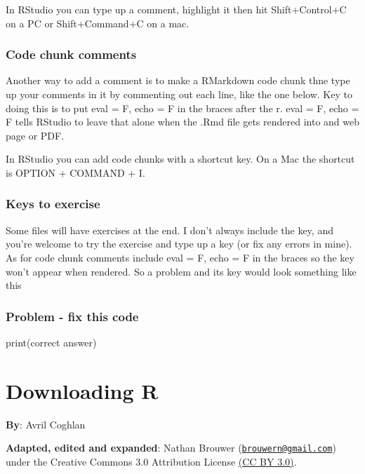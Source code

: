 \documentclass[
]{book}
\newenvironment{Shaded}{\begin{snugshade}}{\end{snugshade}}
\newcommand{\FunctionTok}[1]{\textcolor[rgb]{0.00,0.00,0.00}{#1}}
\newcommand{\NormalTok}[1]{#1}
\begin{document}
In RStudio you can type up a comment, highlight it then hit Shift+Control+C on a PC or Shift+Command+C on a mac.

\hypertarget{code-chunk-comments}{%
\subsection{Code chunk comments}\label{code-chunk-comments}}

Another way to add a comment is to make a RMarkdown code chunk thne type up your comments in it by commenting out each line, like the one below. Key to doing this is to put eval = F, echo = F in the braces after the r. eval = F, echo = F tells RStudio to leave that alone when the .Rmd file gets rendered into and web page or PDF.

In RStudio you can add code chunks with a shortcut key. On a Mac the shortcut is OPTION + COMMAND + I.

\hypertarget{keys-to-exercise}{%
\subsection{Keys to exercise}\label{keys-to-exercise}}

Some files will have exercises at the end. I don't always include the key, and you're welcome to try the exercise and type up a key (or fix any errors in mine). As for code chunk comments include eval = F, echo = F in the braces so the key won't appear when rendered. So a problem and its key would look something like this

\hypertarget{problem---fix-this-code}{%
\subsection{Problem - fix this code}\label{problem---fix-this-code}}

\begin{Shaded}
\begin{Highlighting}[]
\FunctionTok{print}\NormalTok{(correct answer)}
\end{Highlighting}
\end{Shaded}

\hypertarget{downloading-r}{%
\chapter{Downloading R}\label{downloading-r}}

\textbf{By}: Avril Coghlan

\textbf{Adapted, edited and expanded}: Nathan Brouwer (\href{mailto:brouwern@gmail.com}{\nolinkurl{brouwern@gmail.com}}) under the Creative Commons 3.0 Attribution License \href{https://creativecommons.org/licenses/by/3.0/}{(CC BY 3.0)}.
\end{document}
